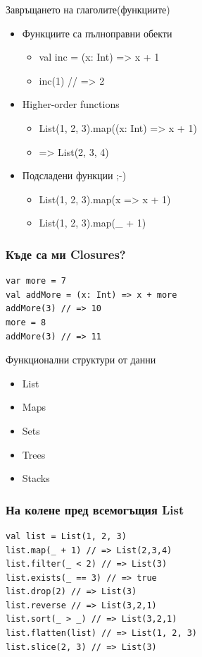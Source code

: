 \documentclass[compress,red]{beamer}
\begin{document}
\begin{frame}{Завръщането на глаголите(функциите)}
  \transdissolve
  \begin{itemize}
  \item Функциите са пълноправни обекти
    \begin{itemize}
    \item val inc = (x: Int) => x + 1
    \item inc(1) // => 2
    \end{itemize}
  \item Higher-order functions
    \begin{itemize}
    \item List(1, 2, 3).map((x: Int) => x + 1)
    \item => List(2, 3, 4)
    \end{itemize}
  \item Подсладени функции ;-)
    \begin{itemize}
    \item List(1, 2, 3).map(x => x + 1)
    \item List(1, 2, 3).map(\_ + 1)
    \end{itemize}
  \end{itemize}
\end{frame}

\begin{frame}[fragile]
  \frametitle{Къде са ми Closures?}
  \transdissolve
\begin{lstlisting}
var more = 7
val addMore = (x: Int) => x + more
addMore(3) // => 10
more = 8
addMore(3) // => 11
\end{lstlisting}
\end{frame}

\begin{frame}{Функционални структури от данни}
  \transdissolve
  \begin{itemize}
  \item List
  \item Maps
  \item Sets
  \item Trees
  \item Stacks
  \end{itemize}
\end{frame}

\begin{frame}[fragile]
  \frametitle{На колене пред всемогъщия List}
  \transdissolve
\begin{lstlisting}
val list = List(1, 2, 3)
list.map(_ + 1) // => List(2,3,4)
list.filter(_ < 2) // => List(3)
list.exists(_ == 3) // => true
list.drop(2) // => List(3)
list.reverse // => List(3,2,1)
list.sort(_ > _) // => List(3,2,1)
list.flatten(list) // => List(1, 2, 3)
list.slice(2, 3) // => List(3)
\end{lstlisting}
\end{frame}
\end{document}
